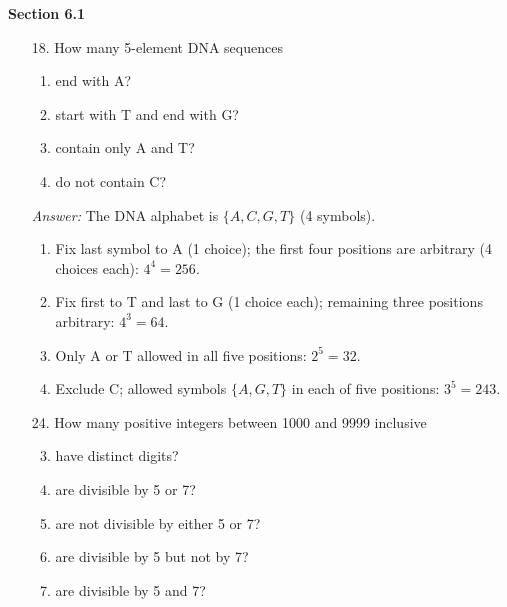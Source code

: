 \documentclass[11pt]{article}
\begin{document}
\noindent \textbf{Section 6.1}
\begin{itemize}
    \item[18.] How many 5-element DNA sequences
    \begin{enumerate}[label=(\alph*)]
        \item end with A?
        \item start with T and end with G?
        \item contain only A and T?
        \item do not contain C?
    \end{enumerate}

    \medskip\textit{Answer:}
    The DNA alphabet is $\{A,C, G, T\}$ (4 symbols).
    \begin{enumerate}[label=(\alph*)]
        \item Fix last symbol to A (1 choice); the first four positions are arbitrary (4 choices each): $4^4=256$.
        \item Fix first to T and last to G (1 choice each); remaining three positions arbitrary: $4^3=64$.
        \item Only A or T allowed in all five positions: $2^5=32$.
        \item Exclude C; allowed symbols $\{A,G,T\}$ in each of five positions: $3^5=243$.
    \end{enumerate}

    \item[24.] How many positive integers between 1000 and 9999 inclusive
    \begin{enumerate}[label=(\alph*)]
        \setcounter{enumi}{2}
        \item have distinct digits?
        \setcounter{enumi}{4}
        \item are divisible by 5 or 7?
        \item are not divisible by either 5 or 7?
        \item are divisible by 5 but not by 7?
        \item are divisible by 5 and 7?
    \end{enumerate}


\end{itemize}
\end{document}
